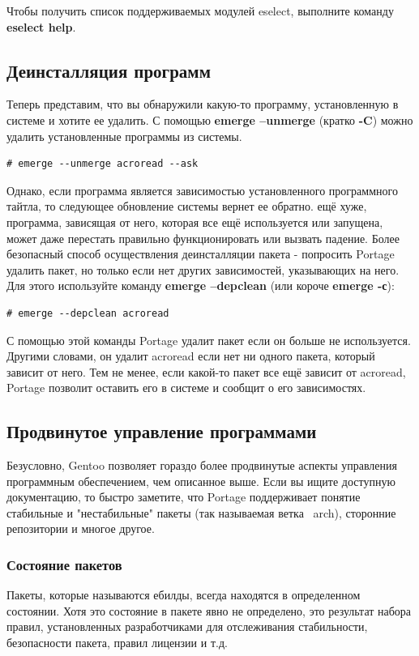 \documentclass[10pt]{book}
\begin{document}
Чтобы получить список поддерживаемых модулей eselect, выполните команду \textbf{eselect help}.
\subsection{Деинсталляция программ}
Теперь представим, что вы обнаружили какую-то программу, установленную в системе и хотите ее удалить. С помощью \textbf{emerge --unmerge} (кратко \textbf{-C}) можно удалить установленные программы из системы.
\begin{tcolorbox}
\begin{lstlisting}
# emerge --unmerge acroread --ask
\end{lstlisting}
\end{tcolorbox}

Однако, если программа является зависимостью установленного программного тайтла, то следующее обновление системы вернет ее обратно. ещё хуже, программа, зависящая от него, которая все ещё используется или запущена, может даже перестать правильно функционировать или вызвать падение. Более безопасный способ осуществления деинсталляции пакета - попросить Portage удалить пакет, но только если нет других зависимостей, указывающих на него. Для этого используйте команду \textbf{emerge --depclean} (или короче\textbf{ emerge -с}):
\begin{tcolorbox}
\begin{lstlisting}
# emerge --depclean acroread
\end{lstlisting}
\end{tcolorbox}
С помощью этой команды Portage удалит пакет если он больше не используется. Другими словами, он удалит acroread если нет ни одного пакета, который зависит от него. Тем не менее, если какой-то пакет все ещё зависит от acroread, Portage позволит оставить его в системе и сообщит о его зависимостях.

\subsection{Продвинутое управление программами}
Безусловно, Gentoo позволяет гораздо более продвинутые аспекты управления программным обеспечением, чем описанное выше. Если вы ищите доступную документацию, то быстро заметите, что Portage поддерживает понятие стабильные и "нестабильные" пакеты (так называемая ветка  ~arch), сторонние репозитории и многое другое.

\subsubsection{Состояние пакетов}
Пакеты, которые называются ебилды, всегда находятся в определенном состоянии. Хотя это состояние в пакете явно не определено, это результат набора правил, установленных разработчиками для отслеживания стабильности, безопасности пакета, правил лицензии и т.д.
\end{document}
